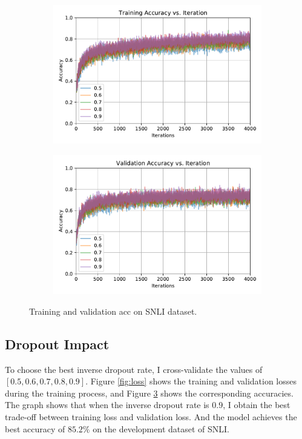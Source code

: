 \documentclass{article}
\begin{document}
\begin{figure}
\centering
\begin{subfigure}{.5\textwidth}
  \centering
  \includegraphics[scale=0.45]{train_acc}
  \label{fig:train_acc}
\end{subfigure}%
\begin{subfigure}{.5\textwidth}
  \centering
  \includegraphics[scale=0.45]{dev_acc}
  \label{fig:dev_acc}
\end{subfigure}
\caption{Training and validation acc on SNLI dataset.}
\label{fig:acc}
\end{figure}

\subsection{Dropout Impact}
To choose the best inverse dropout rate, I cross-validate the values of $[0.5, 0.6, 0.7, 0.8, 0.9]$. Figure \ref{fig:loss} shows the training and validation losses during the training process, and Figure \ref{fig:acc} shows the corresponding accuracies. The graph shows that when the inverse dropout rate is $0.9$, I obtain the best trade-off between training loss and validation loss. And the model achieves the best accuracy of $85.2\%$ on the development dataset of SNLI.
\end{document}
